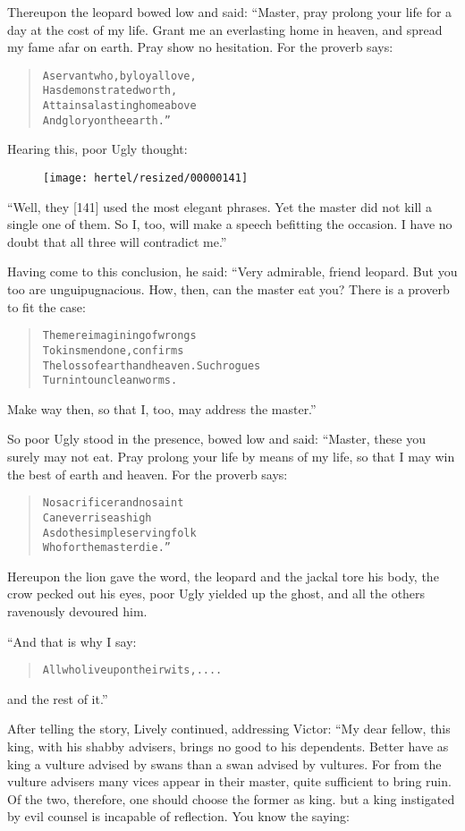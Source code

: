 \documentclass[article, twoside, 10pt]{memoir}
\renewenvironment{verbatim}{%
\begin{quote}%
\vskip -10pt%
\begin{alltt}\normalfont\small}{\end{alltt}%
\end{quote}%
\vskip -10pt
} %
\begin{document}
Thereupon the leopard bowed low and said: “Master, pray prolong
your life for a day at the cost of my life. Grant me an everlasting
home in heaven, and spread my fame afar on earth. Pray show no
hesitation. For the proverb says:

\begin{verbatim}
A servant who, by loyal love,
    Has demonstrated worth,
Attains a lasting home above
    And glory on the earth.”
\end{verbatim}
Hearing this, poor Ugly thought:
\begin{figure}[p]\texttt{[image: hertel/resized/00000141]}\end{figure}``Well, they [141] used the most elegant phrases. Yet the master did not kill a single one of them. So I, too, will make a speech befitting the occasion. I have no doubt that all three will contradict me.''

Having come to this conclusion, he said: “Very admirable, friend
leopard. But you too are unguipugnacious. How, then, can the master
eat you? There is a proverb to fit the case:

\begin{verbatim}
The mere imagining of wrongs
    To kinsmen done, confirms
The loss of earth and heaven. Such rogues
    Turn into unclean worms.
\end{verbatim}
Make way then, so that I, too, may address the master.”

So poor Ugly stood in the presence, bowed low and said: “Master,
these you surely may not eat. Pray prolong your life by means of my
life, so that I may win the best of earth and heaven. For the
proverb says:

\begin{verbatim}
No sacrificer and no saint
    Can ever rise as high
As do the simple servingfolk
    Who for the master die.”
\end{verbatim}
Hereupon the lion gave the word, the leopard and the jackal tore
his body, the crow pecked out his eyes, poor Ugly yielded up the
ghost, and all the others ravenously devoured him.

“And that is why I say:

\begin{verbatim}
All who live upon their wits,....
\end{verbatim}
and the rest of it.”

After telling the story, Lively continued, addressing Victor: “My
dear fellow, this king, with his shabby advisers, brings no good to
his dependents. Better have as king a vulture advised by swans than
a swan advised by vultures. For from the vulture advisers many
vices appear in their master, quite sufficient to bring ruin. Of
the two, therefore, one should choose the former as king. but a
king instigated by evil counsel is incapable of reflection. You
know the saying:
\end{document}
